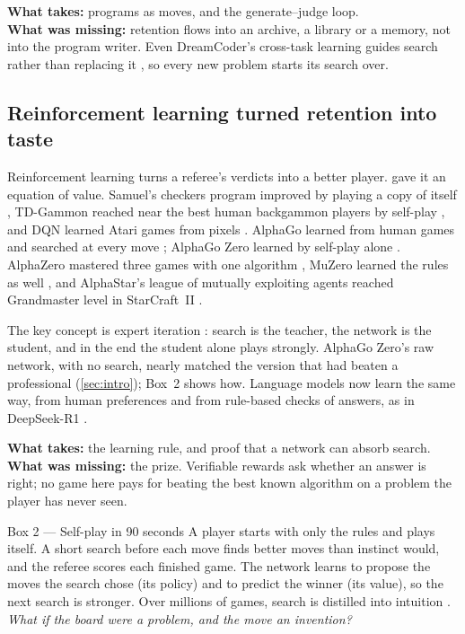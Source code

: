 \smallskip
\noindent\textbf{What \EZ{} takes:} programs as moves, and the
generate--judge loop.\\
\textbf{What was missing:} retention flows into an archive, a library or a
memory, not into the program writer. Even DreamCoder's cross-task learning
guides search rather than replacing it \citep{ellis2021dreamcoder}, so every
new problem starts its search over.

\subsection{Reinforcement learning turned retention into taste}\label{sub:road-rl}

Reinforcement learning turns a referee's verdicts into a better player.
\citet{bellman1957dp} gave it an equation of value. Samuel's checkers
program improved by playing a copy of itself \citep{samuel1959checkers},
TD-Gammon reached near the best human backgammon players by self-play
\citep{tesauro1995tdgammon}, and DQN learned Atari games from pixels
\citep{mnih2015dqn}. AlphaGo learned from human games and searched at every
move \citep{silver2016mastering}; AlphaGo Zero learned by self-play alone
\citep{silver2017mastering}. AlphaZero mastered three games with one
algorithm \citep{silver2018general}, MuZero learned the rules as well
\citep{schrittwieser2020muzero}, and AlphaStar's league of mutually
exploiting agents reached Grandmaster level in StarCraft~II
\citep{vinyals2019alphastar}.

The key concept is expert iteration \citep{anthony2017expert}: search is the
teacher, the network is the student, and in the end the student alone plays
strongly. AlphaGo Zero's raw network, with no search, nearly matched the
version that had beaten a professional (\cref{sec:intro}); Box~2 shows how.
Language models now learn the same way, from human preferences
\citep{christiano2017preferences,ouyang2022instructgpt} and from rule-based
checks of answers, as in DeepSeek-R1 \citep{guo2025deepseekr1}.

\smallskip
\noindent\textbf{What \EZ{} takes:} the learning rule, and proof that a
network can absorb search.\\
\textbf{What was missing:} the prize. Verifiable rewards ask whether an
answer is right; no game here pays for beating the best known algorithm on
a problem the player has never seen.

\begin{explainer}{Box 2 --- Self-play in 90 seconds}
A player starts with only the rules and plays itself. A short search
before each move finds better moves than instinct would, and the referee
scores each finished game. The network learns to propose the moves the
search chose (its policy) and to predict the winner (its value), so the
next search is stronger. Over millions of games, search is distilled into
intuition \citep{anthony2017expert,silver2017mastering}.
\emph{What if the board were a problem, and the move an invention?}
\end{explainer}

